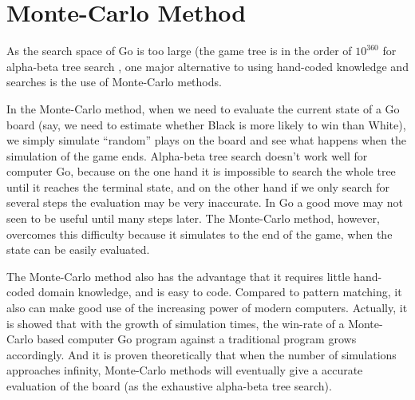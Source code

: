 

\section{Monte-Carlo Method}
As the search space of Go is too large (the game tree is in the order of $10^{360}$ for alpha-beta tree search \cite{bouzy2001computer}, one major alternative to using hand-coded knowledge and searches is the use of Monte-Carlo methods.

In the Monte-Carlo method, when we need to evaluate the current state of a Go board (say, we need to estimate whether Black is more likely to win than White), we simply simulate ``random'' plays on the board and see what happens when the simulation of the game ends. Alpha-beta tree search doesn't work well for computer Go, because on the one hand it is impossible to search the whole tree until it reaches the terminal state, and on the other hand if we only search for several steps the evaluation may be very inaccurate. In Go a good move may not seen to be useful until many steps later. The Monte-Carlo method, however, overcomes this difficulty because it simulates to the end of the game, when the state can be easily evaluated.

The Monte-Carlo method also has the advantage that it requires little hand-coded domain knowledge, and is easy to code. Compared to pattern matching, it also can make good use of the increasing power of modern computers. Actually, it is showed that with the growth of simulation times, the win-rate of a Monte-Carlo based computer Go program against a traditional program grows accordingly\cite{enzenberger2010fuego}. And it is proven theoretically that when the number of simulations approaches infinity, Monte-Carlo methods will eventually give a accurate evaluation of the board (as the exhaustive alpha-beta tree search)\cite{kocsis2006bandit}.

